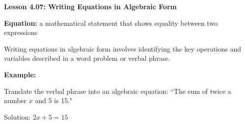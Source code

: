 \begin{center}
\textbf{Lesson 4.07: Writing Equations in Algebraic Form}
\end{center}

\vspace*{-1.5ex}

\noindent \textbf{Equation:} a mathematical statement that shows equality between two expressions

\noindent Writing equations in algebraic form involves identifying the key operations and variables described in a word problem or verbal phrase.

\noindent\textbf{Example:}

Translate the verbal phrase into an algebraic equation:  
``The sum of twice a number \(x\) and 5 is 15."

Solution: \(2x + 5 = 15\)

